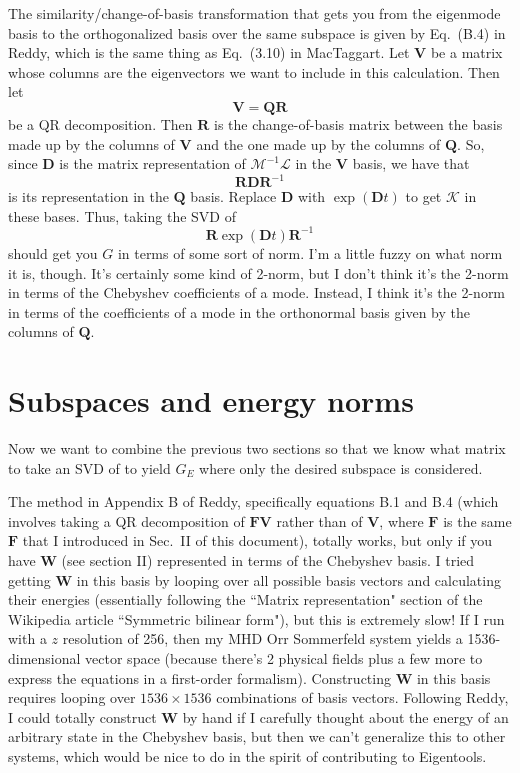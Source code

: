 \documentclass[aps,pop,preprint]{revtex4}
\begin{document}
The similarity/change-of-basis transformation that gets you from the eigenmode basis to the orthogonalized basis over the same subspace is given by Eq.~(B.4) in Reddy, which is the same thing as Eq.~(3.10) in MacTaggart. 
Let $\mathbf{V}$ be a matrix whose columns are the eigenvectors we want to include in this calculation. 
Then let
\begin{equation}
\mathbf{V} = \mathbf{QR}
\end{equation}
be a QR decomposition. 
Then $\mathbf{R}$ is the change-of-basis matrix between the basis made up by the columns of $\mathbf{V}$ and the one made up by the columns of $\mathbf{Q}$. 
So, since $\mathbf{D}$ is the matrix representation of $\mathcal{M}^{-1}\mathcal{L}$ in the $\mathbf{V}$ basis, we have that
\begin{equation}
\mathbf{R} \mathbf{D} \mathbf{R}^{-1}
\end{equation}
is its representation in the $\mathbf{Q}$ basis. 
Replace $\mathbf{D}$ with $\exp(\mathbf{D} t)$ to get $\mathcal{K}$ in these bases. 
Thus, taking the SVD of
\begin{equation}
\mathbf{R} \exp(\mathbf{D} t) \mathbf{R}^{-1}
\end{equation}
should get you $G$ in terms of some sort of norm. 
I'm a little fuzzy on what norm it is, though. 
It's certainly some kind of 2-norm, but I don't think it's the 2-norm in terms of the Chebyshev coefficients of a mode. 
Instead, I think it's the 2-norm in terms of the coefficients of a mode in the orthonormal basis given by the columns of $\mathbf{Q}$.

\section{Subspaces and energy norms}
Now we want to combine the previous two sections so that we know what matrix to take an SVD of to yield $G_E$ where only the desired subspace is considered. 

The method in Appendix B of Reddy, specifically equations B.1 and B.4 (which involves taking a QR decomposition of $\mathbf{FV}$ rather than of $\mathbf{V}$, where $\mathbf{F}$ is the same $\mathbf{F}$ that I introduced in Sec.~II of this document), totally works, but only if you have $\mathbf{W}$ (see section II) represented in terms of the Chebyshev basis. 
I tried getting $\mathbf{W}$ in this basis by looping over all possible basis vectors and calculating their energies (essentially following the ``Matrix representation" section of the Wikipedia article ``Symmetric bilinear form"), but this is extremely slow! 
If I run with a $z$ resolution of 256, then my MHD Orr Sommerfeld system yields a 1536-dimensional vector space (because there's 2 physical fields plus a few more to express the equations in a first-order formalism). 
Constructing $\mathbf{W}$ in this basis requires looping over $1536 \times 1536$ combinations of basis vectors. 
Following Reddy, I could totally construct $\mathbf{W}$ by hand if I carefully thought about the energy of an arbitrary state in the Chebyshev basis, but then we can't generalize this to other systems, which would be nice to do in the spirit of contributing to Eigentools. 
\end{document}
